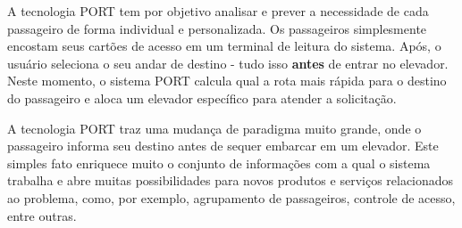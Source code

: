 A tecnologia PORT tem por objetivo analisar e prever a necessidade de cada
passageiro de forma individual e personalizada. Os passageiros simplesmente
encostam seus cartões de acesso em um terminal de leitura do sistema. Após, o
usuário seleciona o seu andar de destino - tudo isso \textbf{antes} de entrar no
elevador. Neste momento, o sistema PORT calcula qual a rota mais rápida para o
destino do passageiro e aloca um elevador específico para atender a solicitação.

A tecnologia PORT traz uma mudança de paradigma muito grande, onde o passageiro
informa seu destino antes de sequer embarcar em um elevador. Este simples fato
enriquece muito o conjunto de informações com a qual o sistema trabalha e abre
muitas possibilidades para novos produtos e serviços relacionados ao problema,
como, por exemplo, agrupamento de passageiros, controle de acesso, entre outras.
